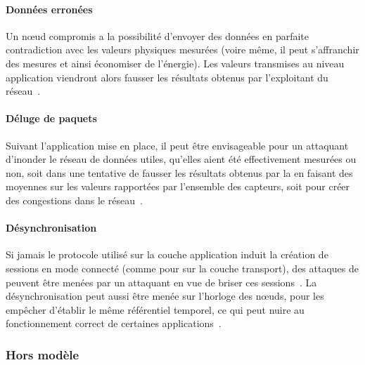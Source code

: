         \paragraph{Données erronées}
Un nœud compromis a la possibilité d'envoyer des données en parfaite contradiction avec les valeurs physiques mesurées (voire même, il peut s'affranchir des mesures et ainsi économiser de l'énergie).
Les valeurs transmises au niveau application viendront alors fausser les résultats obtenus par l'exploitant du réseau~\cite{SZFDXC14}.

        \paragraph{Déluge de paquets}
Suivant l'application mise en place, il peut être envisageable pour un attaquant d'inonder le réseau de données utiles, qu'elles aient été effectivement mesurées ou non, soit dans une tentative de fausser les résultats obtenus par la \sdb en faisant des moyennes sur les valeurs rapportées par l'ensemble des capteurs, soit pour créer des congestions dans le réseau~\cite{AJ11}.

        \paragraph{Désynchronisation}
Si jamais le protocole utilisé sur la couche application induit la création de sessions en mode connecté (comme pour \tcp sur la couche transport), des attaques de \desync peuvent être menées par un attaquant en vue de briser ces sessions~\cite{AD14}.
La désynchronisation peut aussi être menée sur l'horloge des nœuds, pour les empêcher d'établir le même référentiel temporel, ce qui peut nuire au fonctionnement correct de certaines applications~\cite{SZFDXC14}.

    \subsubsection{Hors modèle}
